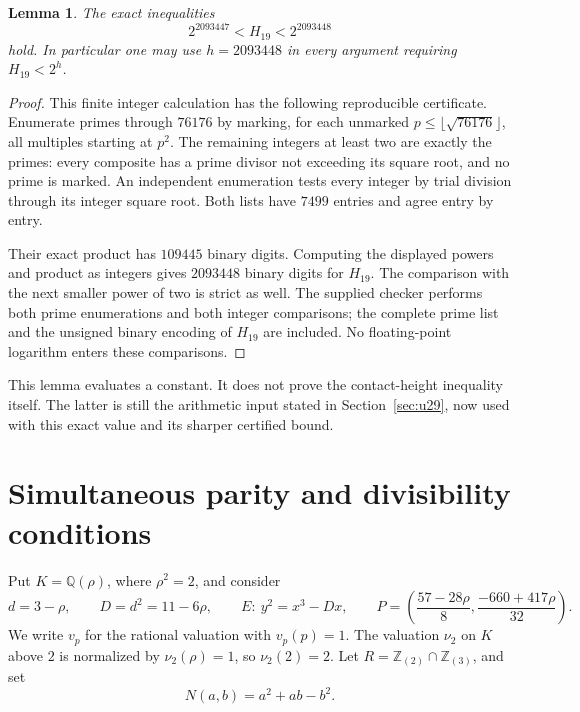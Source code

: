 \documentclass[11pt,a4paper]{article}
\newtheorem{lemma}[theorem]{Lemma}
\theoremstyle{definition}
\theoremstyle{remark}
\begin{document}
\begin{lemma}\label{lem:exact-height-constant}
The exact inequalities
\[
                 2^{2093447}<H_{19}<2^{2093448}
\]
hold. In particular one may use $h=2093448$ in every argument
requiring $H_{19}<2^h$.
\end{lemma}
\begin{proof}
This finite integer calculation has the following reproducible
certificate. Enumerate primes through $76176$ by marking, for
each unmarked $p\le\lfloor\sqrt{76176}\rfloor$, all multiples
starting at $p^2$. The remaining integers at least two are
exactly the primes: every composite has a prime divisor not
exceeding its square root, and no prime is marked.
An independent enumeration tests every integer by trial division
through its integer square root. Both lists have $7499$ entries
and agree entry by entry.

Their exact product has $109445$ binary digits. Computing the
displayed powers and product as integers gives $2093448$ binary
digits for $H_{19}$. The comparison with the next smaller power
of two is strict as well. The supplied checker performs both
prime enumerations and both integer comparisons; the complete
prime list and the unsigned binary encoding of $H_{19}$ are
included. No floating-point logarithm enters these comparisons.
\end{proof}

This lemma evaluates a constant. It does not prove the
contact-height inequality itself. The latter is still the
arithmetic input stated in Section~\ref{sec:u29}, now used with
this exact value and its sharper certified bound.


\section{Simultaneous parity and divisibility conditions}
\label{sec:parity-batching}

Put $K=\mathbb Q(\rho)$, where $\rho^2=2$, and consider
\[
 d=3-\rho,\qquad D=d^2=11-6\rho,\qquad
 E:\ y^2=x^3-Dx,
 \qquad
 P=\left(\frac{57-28\rho}{8},
          \frac{-660+417\rho}{32}\right).
\]
We write $v_p$ for the rational valuation with $v_p(p)=1$.
The valuation $\nu_2$ on $K$ above $2$ is normalized by
$\nu_2(\rho)=1$, so $\nu_2(2)=2$.
Let $R=\mathbb Z_{(2)}\cap\mathbb Z_{(3)}$, and set
\[
                         N(a,b)=a^2+ab-b^2.
\]
\end{document}

